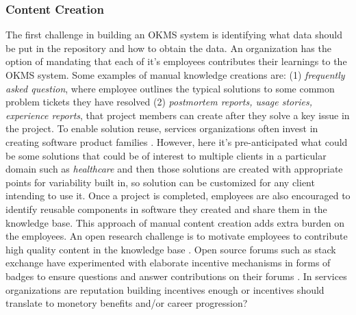 \subsubsection{Content Creation}

The first challenge in building an OKMS system is identifying what data should be put in the repository and how to obtain the data. An organization has the option of mandating that each of it's employees contributes their learnings to the OKMS system. Some examples of manual knowledge creations are: (1) \textit{frequently asked question}, where employee outlines the typical solutions to some common problem tickets they have resolved (2) \textit{postmortem reports, usage stories, experience reports}\cite{}, that project members can create after they solve a key issue in the project. To enable solution reuse, services organizations often invest in creating software product families \cite{}. However, here it's pre-anticipated what could be some solutions that could be of interest to multiple clients in a particular domain such as \textit{healthcare} and then those solutions are created with appropriate points for variability built in, so solution can be customized for any client intending to use it.  Once a project is completed, employees are also encouraged to identify reusable components in software they created and share them in the knowledge base. This approach of manual content creation adds extra burden on the employees. An open research challenge is to motivate employees to contribute high quality content in the knowledge base \cite{}. Open source forums such as stack exchange have experimented with elaborate incentive mechanisms in forms of badges to ensure questions and answer contributions on their forums \cite{}. In services organizations are reputation building incentives enough or incentives should translate to monetory benefits and/or career progression? 

